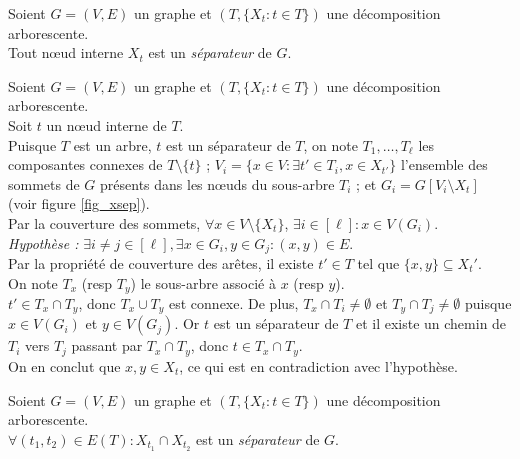 \proposition{}
\label{xsep}
	Soient $G = (V,E)$ un graphe et $(T,\{X_t : t\in T\})$ une décomposition arborescente.\\
	Tout n\oe ud interne $X_t$ est un {\em séparateur} de $G$.

	Soient $G = (V,E)$ un graphe et $(T,\{X_t : t\in T\})$ une décomposition arborescente.
\\
	Soit $t$ un n\oe ud interne de $T$.
\\
	Puisque $T$ est un arbre, $t$ est un séparateur de $T$, on note
	$T_1,\dots,T_\ell$ les composantes connexes de $T\setminus\{t\}$ ;
	$V_i = \{x \in V : \exists t' \in T_i, x\in X_{t'}\}$ l'ensemble
	des sommets de $G$ présents dans les n\oe uds du sous-arbre $T_i$ ;
	et $G_i = G[V_i\setminus X_t]$
	(voir figure \ref{fig_xsep}).
\\
	Par la couverture des sommets, $\forall x \in V \setminus \{X_t\}$,
	$\exists i \in [\ell] : x \in V(G_i)$.
\\
	{\em Hypothèse :} $\exists i \neq j \in [\ell], \exists x \in G_i, y \in G_j : (x,y) \in E$.
\\
	Par la propriété de couverture des arêtes, il existe $t' \in T$ tel que
	$\{x,y\} \subseteq X_t'$.
\\
	On note $T_x$ (resp $T_y$) le sous-arbre associé à $x$ (resp $y$).
\\
	$t' \in T_x \cap T_y$, donc $T_x \cup T_y$ est connexe.
	De plus, $T_x \cap T_i \neq \emptyset$ et $T_y \cap T_j \neq \emptyset$ puisque
	$x \in V(G_i)$ et $y \in V(G_j)$.
	Or $t$ est un séparateur de $T$ et il existe un chemin de $T_i$ vers $T_j$ 
	passant par $T_x \cap T_y$, donc $t \in T_x \cap T_y$.
\\
	On en conclut que $x,y \in X_t$, ce qui est en contradiction avec l'hypothèse.

	


\proposition{}
\label{isep}
	Soient $G = (V,E)$ un graphe et $(T,\{X_t : t\in T\})$ une décomposition arborescente.\\
	$\forall (t_1,t_2) \in E(T) : X_{t_1} \cap X_{t_2}$ est un {\em séparateur} de $G$.

